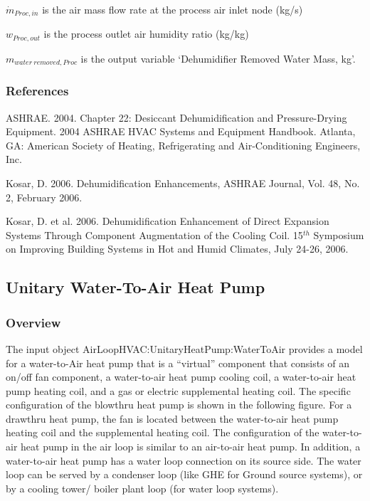 \({\dot{m}_{Proc,in}}\) is the air mass flow rate at the process air inlet node (kg/s)

\({w_{Proc,out}}\) is the process outlet air humidity ratio (kg/kg)

\({m_{water~removed,Proc}}\) is the output variable `Dehumidifier Removed Water Mass, kg'.

\subsubsection{References}\label{references-000}

ASHRAE. 2004. Chapter 22: Desiccant Dehumidification and Pressure-Drying Equipment. 2004 ASHRAE HVAC Systems and Equipment Handbook. Atlanta, GA: American Society of Heating, Refrigerating and Air-Conditioning Engineers, Inc.

Kosar, D. 2006. Dehumidification Enhancements, ASHRAE Journal, Vol. 48, No. 2, February 2006.

Kosar, D. et al. 2006. Dehumidification Enhancement of Direct Expansion Systems Through Component Augmentation of the Cooling Coil. 15\(^{th}\) Symposium on Improving Building Systems in Hot and Humid Climates, July 24-26, 2006.

\subsection{Unitary Water-To-Air Heat Pump}\label{unitary-water-to-air-heat-pump}

\subsubsection{Overview}\label{overview-8}

The input object AirLoopHVAC:UnitaryHeatPump:WaterToAir provides a model for a water-to-Air heat pump that is a ``virtual'' component that consists of an on/off fan component, a water-to-air heat pump cooling coil, a water-to-air heat pump heating coil, and a gas or electric supplemental heating coil. The specific configuration of the blowthru heat pump is shown in the following figure. For a drawthru heat pump, the fan is located between the water-to-air heat pump heating coil and the supplemental heating coil. The configuration of the water-to-air heat pump in the air loop is similar to an air-to-air heat pump. In addition, a water-to-air heat pump has a water loop connection on its source side. The water loop can be served by a condenser loop (like GHE for Ground source systems), or by a cooling tower/ boiler plant loop (for water loop systems).

